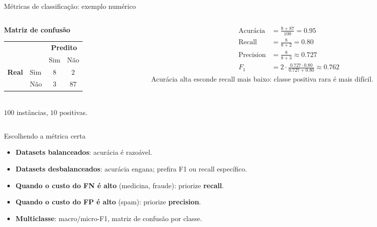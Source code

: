 \documentclass[aspectratio=169,xcolor=dvipsnames]{beamer}
\begin{document}
  \begin{frame}{Métricas de classificação: exemplo numérico}
    \begin{columns}
      \begin{column}{.42\linewidth}
        \centering
        \textbf{Matriz de confusão}\\[0.3em]
        \begin{tabular}{ll|cc}
          \toprule
            & & \multicolumn{2}{c}{\textbf{Predito}} \\
            & & Sim & Não \\
          \midrule
          \textbf{Real} & Sim & $8$ & $2$ \\
                        & Não & $3$ & $87$ \\
          \bottomrule
        \end{tabular}\\[0.3em]
        {\footnotesize $100$ instâncias, $10$ positivas.}
      \end{column}
      \begin{column}{.55\linewidth}
        \begin{align*}
          \text{Acurácia} &= \tfrac{8+87}{100} = 0.95 \\
          \text{Recall}   &= \tfrac{8}{8+2} = 0.80 \\
          \text{Precision}&= \tfrac{8}{8+3} \approx 0.727 \\
          F_1             &= 2\cdot\tfrac{0.727 \cdot 0.80}{0.727 + 0.80} \approx 0.762
        \end{align*}
        {\footnotesize Acurácia alta esconde recall mais baixo: classe positiva rara é mais difícil.}
      \end{column}
    \end{columns}
  \end{frame}

  \begin{frame}{Escolhendo a métrica certa}
    \begin{itemize}
      \item \textbf{Datasets balanceados}: acurácia é razoável.
      \item \textbf{Datasets desbalanceados}: acurácia engana; prefira F1 ou recall específico.
      \item \textbf{Quando o custo do FN é alto} (medicina, fraude): priorize \textbf{recall}.
      \item \textbf{Quando o custo do FP é alto} (spam): priorize \textbf{precision}.
      \item \textbf{Multiclasse}: macro/micro-F1, matriz de confusão por classe.
    \end{itemize}
  \end{frame}
\end{document}
